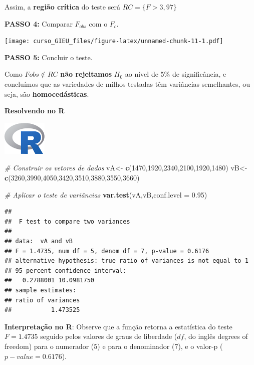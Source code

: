 \documentclass[
]{book}
\newenvironment{Shaded}{\begin{snugshade}}{\end{snugshade}}
\newcommand{\CommentTok}[1]{\textcolor[rgb]{0.56,0.35,0.01}{\textit{#1}}}
\newcommand{\DataTypeTok}[1]{\textcolor[rgb]{0.13,0.29,0.53}{#1}}
\newcommand{\DecValTok}[1]{\textcolor[rgb]{0.00,0.00,0.81}{#1}}
\newcommand{\FloatTok}[1]{\textcolor[rgb]{0.00,0.00,0.81}{#1}}
\newcommand{\KeywordTok}[1]{\textcolor[rgb]{0.13,0.29,0.53}{\textbf{#1}}}
\newcommand{\NormalTok}[1]{#1}
\newcommand{\StringTok}[1]{\textcolor[rgb]{0.31,0.60,0.02}{#1}}
\begin{document}
Assim, a \textbf{região crítica} do teste será \(RC = \{F > 3,97\}\)

\textbf{PASSO 4:} Comparar \(F_{obs}\) com o \(F_c\).

\texttt{[image: curso\_GIEU\_files/figure-latex/unnamed-chunk-11-1.pdf]}

\textbf{PASSO 5:} Concluir o teste.

Como \(F{obs} \not\in RC\) \textbf{não rejeitamos } \(H_0\) ao nível de 5\% de significância, e concluímos que as variedades de milhos testadas têm variâncias semelhantes, ou seja, são \textbf{homocedásticas}.

\textbf{Resolvendo no R}

\includegraphics{Rlogo.png}

\begin{Shaded}
\begin{Highlighting}[]
\CommentTok{# Construir os vetores de dados}
\NormalTok{vA<-}\StringTok{ }\KeywordTok{c}\NormalTok{(}\DecValTok{1470}\NormalTok{,}\DecValTok{1920}\NormalTok{,}\DecValTok{2340}\NormalTok{,}\DecValTok{2100}\NormalTok{,}\DecValTok{1920}\NormalTok{,}\DecValTok{1480}\NormalTok{)}
\NormalTok{vB<-}\StringTok{ }\KeywordTok{c}\NormalTok{(}\DecValTok{3260}\NormalTok{,}\DecValTok{3990}\NormalTok{,}\DecValTok{4050}\NormalTok{,}\DecValTok{3420}\NormalTok{,}\DecValTok{3510}\NormalTok{,}\DecValTok{3880}\NormalTok{,}\DecValTok{3550}\NormalTok{,}\DecValTok{3660}\NormalTok{)}

\CommentTok{# Aplicar o teste de variâncias}
\KeywordTok{var.test}\NormalTok{(vA,vB,}\DataTypeTok{conf.level =} \FloatTok{0.95}\NormalTok{)}
\end{Highlighting}
\end{Shaded}

\begin{verbatim}
## 
## 	F test to compare two variances
## 
## data:  vA and vB
## F = 1.4735, num df = 5, denom df = 7, p-value = 0.6176
## alternative hypothesis: true ratio of variances is not equal to 1
## 95 percent confidence interval:
##   0.2788001 10.0981750
## sample estimates:
## ratio of variances 
##           1.473525
\end{verbatim}

\textbf{Interpretação no R}: Observe que a função retorna a estatística do teste \(F = 1.4735\) seguido pelos valores de graus de liberdade (\(df\), do inglês degrees of freedom) para o numerador (\(5\)) e para o denominador (\(7\)), e o valor-p (\(p-value = 0.6176\)).
\end{document}
